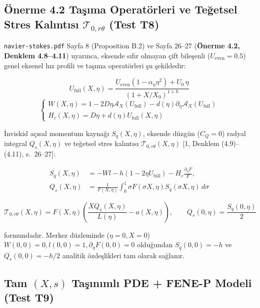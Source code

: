 \documentclass[12pt,a4paper]{article}
\begin{document}
\subsection{Önerme 4.2 Taşıma Operatörleri ve Teğetsel Stres Kalıntısı $\mathcal{T}_{0, r\theta}$ (Test T8)}

\texttt{navier-stokes.pdf} Sayfa 8 (Proposition B.2) ve Sayfa 26--27 (\textbf{Önerme 4.2, Denklem 4.8--4.11}) uyarınca, eksende sıfır olmayan çift bileşenli ($U_{\mathrm{even}} = 0.5$) genel eksenel hız profili ve taşıma operatörleri şu şekildedir:

\begin{equation}
U_{\mathrm{full}}(X, \eta) = \frac{U_{\mathrm{even}}(1 - \alpha_\eta \eta^2) + U_0 \, \eta}{(1 + X / X_0)^{1 + h}}
\end{equation}
\begin{equation}
\begin{cases}
W(X, \eta) = 1 - 2D\eta \mathcal{A}_X(U_{\mathrm{full}}) - d(\eta) \partial_\eta \mathcal{A}_X(U_{\mathrm{full}}) \\
H_c(X, \eta) = D\eta + d(\eta) U_{\mathrm{full}}(X, \eta)
\end{cases}
\end{equation}

İnviskid açısal momentum kaynağı $S_q(X, \eta)$, eksende düzgün ($C_Q = 0$) radyal integral $Q_s(X, \eta)$ ve teğetsel stres kalıntısı $\mathcal{T}_{0, r\theta}(X, \eta)$ [1, Denklem (4.9)--(4.11), s.\ 26--27]:

\begin{equation}
\begin{split}
S_q(X, \eta) &= -W l - h(1 - 2\eta U_{\mathrm{full}}) - H_c \frac{\partial_\eta F}{F}, \\
Q_s(X, \eta) &= \frac{1}{F(X, \eta)} \int_0^1 \sigma F(\sigma X, \eta) S_q(\sigma X, \eta) \, d\sigma
\end{split}
\end{equation}

\begin{equation}
\mathcal{T}_{0, r\theta}(X, \eta) = F(X, \eta) \left( \frac{X Q_s(X, \eta)}{L(\eta)} - a(X, \eta) \right), \qquad Q_s(0, \eta) = \frac{S_q(0, \eta)}{2}
\end{equation}

formundadır. Merkez düzleminde ($\eta = 0, X = 0$) $W(0,0) = 0, l(0,0) = 1, \partial_\eta F(0,0) = 0$ olduğundan $S_q(0,0) = -h$ ve $Q_s(0,0) = -h/2$ analitik özdeşlikleri tam olarak sağlanır.

\subsection{Tam $(X, s)$ Taşınımlı PDE + FENE-P Modeli (Test T9)}
\end{document}
